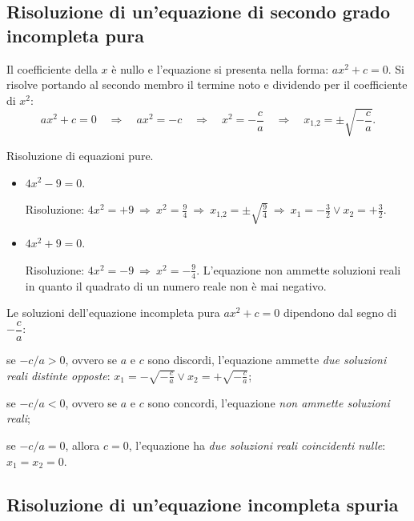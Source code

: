 \subsection{Risoluzione di un'equazione di secondo grado incompleta pura}

Il coefficiente della $x$ è nullo e l'equazione si presenta nella forma: $ax ^{2 } + c = 0$.
Si risolve portando al secondo membro il termine noto e dividendo per il coefficiente di $x^2$:
\[a x ^{2} + c = 0 \quad\Rightarrow\quad a x ^{2 } = - c \quad\Rightarrow\quad x
^{2} = - \frac{c }{a } \quad\Rightarrow\quad x _{1\text{,}2} = \pm \sqrt{- \frac{c}{a}}.\]
\pagebreak
\begin{exrig}
\begin{esempio}
 Risoluzione di equazioni pure.
\begin{itemize}
\item $4 x ^{2} - 9 =0$.

Risoluzione: $4 x ^{2 } = + 9 \:\Rightarrow\: x ^{2 } = \frac{9 }{4 }
\:\Rightarrow\: x _{1\text{,}2 } = \pm \sqrt{\frac{9 }{4 } } \:\Rightarrow\: x_{1} = - \frac{3 }{2 } \vee x _{2 } = + \frac{3 }{2 }$.
\item $4 x ^{2 } + 9 = 0$.

Risoluzione: $4 x ^{2 } = -9 \:\Rightarrow\: x ^{2 } = - \frac{9 }{4 }$. L'equazione non ammette soluzioni reali in quanto il quadrato di un numero reale non è mai negativo.
\end{itemize}
\end{esempio}
\end{exrig}

Le soluzioni dell'equazione incompleta pura $ax ^{2 } + c = 0$ dipendono dal segno di
$- \dfrac{c }{a }$:
\begin{itemize*}
\item se $-c/a>0$, ovvero se $a$ e $c$ sono discordi, l'equazione ammette \emph{due soluzioni reali distinte opposte}: $x _{1 } = - \sqrt{- \frac{c }{a}} \vee x_{2}= + \sqrt{-\frac{c}{a}}$;
\item se $-c/a<0$, ovvero se $a$ e $c$ sono concordi, l'equazione \emph{non ammette soluzioni reali};
\item se $-c/a=0$, allora $c =0$, l'equazione ha \emph{due soluzioni reali coincidenti nulle}: $x_{1}=x_{2} =0$.
\end{itemize*}

\vspazio\ovalbox{\risolvii \ref{ese:3.1}, \ref{ese:3.2}, \ref{ese:3.3}, \ref{ese:3.4}}

\subsection{Risoluzione di un'equazione incompleta spuria}

